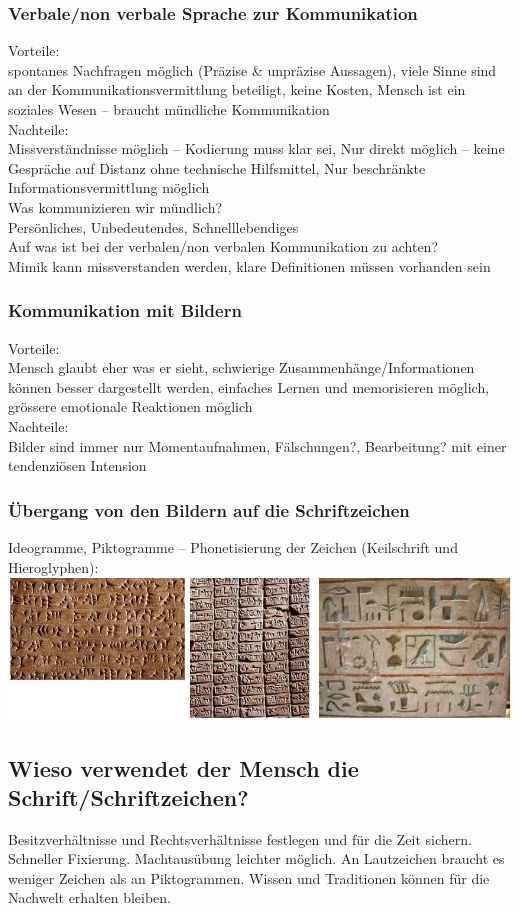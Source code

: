 \documentclass[10pt, openright=true]{scrartcl}
\begin{document}
\subsubsection{Verbale/non verbale Sprache zur Kommunikation}
Vorteile:\\
spontanes Nachfragen möglich (Präzise \& unpräzise Aussagen), viele Sinne sind an der Kommunikationsvermittlung beteiligt, keine Kosten, Mensch ist ein soziales Wesen – braucht mündliche Kommunikation\\ Nachteile:\\
Missverständnisse möglich – Kodierung muss klar sei, Nur direkt möglich – keine Gespräche auf Distanz ohne technische Hilfsmittel, Nur beschränkte Informationsvermittlung möglich\\
Was kommunizieren wir mündlich?\\
Persönliches, Unbedeutendes, Schnelllebendiges\\
Auf was ist bei der verbalen/non verbalen Kommunikation zu achten?\\
Mimik kann missverstanden werden, klare Definitionen müssen vorhanden sein
\subsubsection{Kommunikation mit Bildern}
Vorteile:\\
Mensch glaubt eher was er sieht, schwierige Zusammenhänge/Informationen können besser dargestellt werden, einfaches Lernen und memorisieren möglich, grössere emotionale Reaktionen möglich\\ Nachteile:\\
Bilder sind immer nur Momentaufnahmen, Fälschungen?, Bearbeitung? mit einer tendenziösen Intension
\subsubsection{Übergang von den Bildern auf die Schriftzeichen}
Ideogramme, Piktogramme – Phonetisierung der Zeichen (Keilschrift und Hieroglyphen):\\
\includegraphics[width=.8\textwidth]{images/hyro}
\subsection{Wieso verwendet der Mensch die Schrift/Schriftzeichen?}
Besitzverhältnisse und Rechtsverhältnisse festlegen und für die Zeit sichern. Schneller Fixierung. Machtausübung leichter möglich. An Lautzeichen braucht es weniger Zeichen als an Piktogrammen. Wissen und Traditionen können für die Nachwelt erhalten bleiben.
\end{document}
